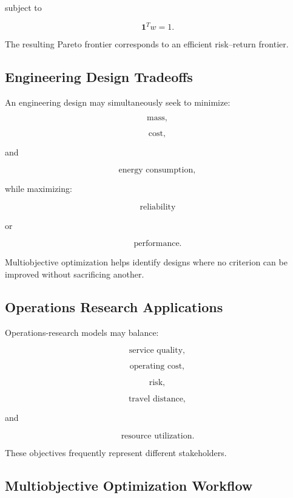subject to

\[
\boxed{
\mathbf{1}^Tw=1.
}
\]

The resulting Pareto frontier corresponds to an efficient risk--return
frontier.

\subsection{Engineering Design Tradeoffs}
\label{subsec:engineering-multiobjective}

An engineering design may simultaneously seek to minimize:

\[
\boxed{
\text{mass},
}
\]

\[
\boxed{
\text{cost},
}
\]

and

\[
\boxed{
\text{energy consumption},
}
\]

while maximizing:

\[
\boxed{
\text{reliability}
}
\]

or

\[
\boxed{
\text{performance}.
}
\]

Multiobjective optimization helps identify designs where no criterion can
be improved without sacrificing another.

\subsection{Operations Research Applications}
\label{subsec:or-multiobjective}

Operations-research models may balance:

\[
\boxed{
\text{service quality},
}
\]

\[
\boxed{
\text{operating cost},
}
\]

\[
\boxed{
\text{risk},
}
\]

\[
\boxed{
\text{travel distance},
}
\]

and

\[
\boxed{
\text{resource utilization}.
}
\]

These objectives frequently represent different stakeholders.

\subsection{Multiobjective Optimization Workflow}
\label{subsec:multiobjective-workflow}

